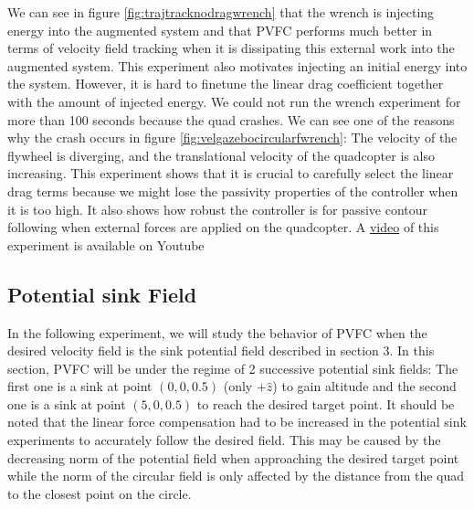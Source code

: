 We can see in figure \ref{fig:trajtracknodragwrench} that the wrench is injecting energy into the augmented system and that PVFC performs much better in terms of velocity field tracking when it is dissipating this external work into the augmented system. 
This experiment also motivates injecting an initial energy into the system. However, it is hard to finetune the linear drag coefficient together with the amount of injected energy.
We could not run the wrench experiment for more than 100 seconds because the quad crashes. We can see one of the reasons why the crash occurs in figure \ref{fig:velgazebocircularfwrench}: The velocity of the flywheel is diverging, and the translational velocity of the quadcopter is also increasing. 
This experiment shows that it is crucial to carefully select the linear drag terms because we might lose the passivity properties of the controller when it is too high.
It also shows how robust the controller is for passive contour following when external forces are applied on the quadcopter.
A \href{https://youtu.be/NcAQGyCOlOk}{video} of this experiment is available on Youtube
\subsection{Potential sink Field}
In the following experiment, we will study the behavior of PVFC when the desired velocity field is the sink potential field described in section 3.
In this section, PVFC will be under the regime of 2 successive potential sink fields: The first one is a sink at point $(0,0,0.5)$ (only $+\hat{z}$) to gain altitude and
the second one is a sink at point $(5,0,0.5)$ to reach the desired target point. 
It should be noted that the linear force compensation had to be increased in the potential sink experiments to accurately follow the desired field.
This may be caused by the decreasing norm of the potential field when approaching the desired target point while the norm of the circular field is only affected by the distance from the quad to the closest point on the circle.  
